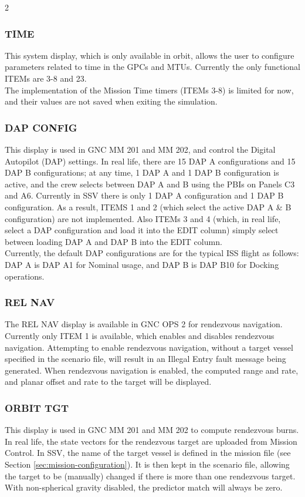 \documentclass[Space_Shuttle_Vessel_Manual.tex]{subfiles}
\begin{document}
\begin{multicols*}{2}
\subsubsection{TIME}
This system display, which is only available in orbit, allows the user to configure parameters related to time in the GPCs and MTUs. Currently the only functional ITEMs are 3-8 and 23.\\
The implementation of the Mission Time timers (ITEMs 3-8) is limited for now, and their values are not saved when exiting the simulation.

\subsubsection{DAP CONFIG}
This display is used in GNC MM 201 and MM 202, and control the Digital Autopilot (DAP) settings. In real life, there are 15 DAP A configurations and 15 DAP B configurations; at any time, 1 DAP A and 1 DAP B configuration is active, and the crew selects between DAP A and B using the PBIs on Panels C3 and A6. Currently in SSV there is only 1 DAP A configuration and 1 DAP B configuration. As a result, ITEMS 1 and 2 (which select the active DAP A \& B configuration) are not implemented. Also ITEMs 3 and 4 (which, in real life, select a DAP configuration and load it into the EDIT column) simply select between loading DAP A and DAP B into the EDIT column.\\
Currently, the default DAP configurations are for the typical ISS flight as follows: DAP A is DAP A1 for Nominal usage, and DAP B is DAP B10 for Docking operations.

\subsubsection{REL NAV}
The REL NAV display is available in GNC OPS 2 for rendezvous navigation. Currently only ITEM 1 is available, which enables and disables rendezvous navigation. Attempting to enable rendezvous navigation, without a target vessel specified in the scenario file, will result in an Illegal Entry fault message being generated. When rendezvous navigation is enabled, the computed range and rate, and planar offset and rate to the target will be displayed.

\subsubsection{ORBIT TGT}
This display is used in GNC MM 201 and MM 202 to compute rendezvous burns. In real life, the state vectors for the rendezvous target are uploaded from Mission Control. In SSV, the name of the target vessel is defined in the mission file (see Section \ref{sec:mission-configuration}). It is then kept in the scenario file, allowing the target to be (manually) changed if there is more than one rendezvous target.\\
With non-spherical gravity disabled, the predictor match will always be zero.


\end{multicols*}
\end{document}
